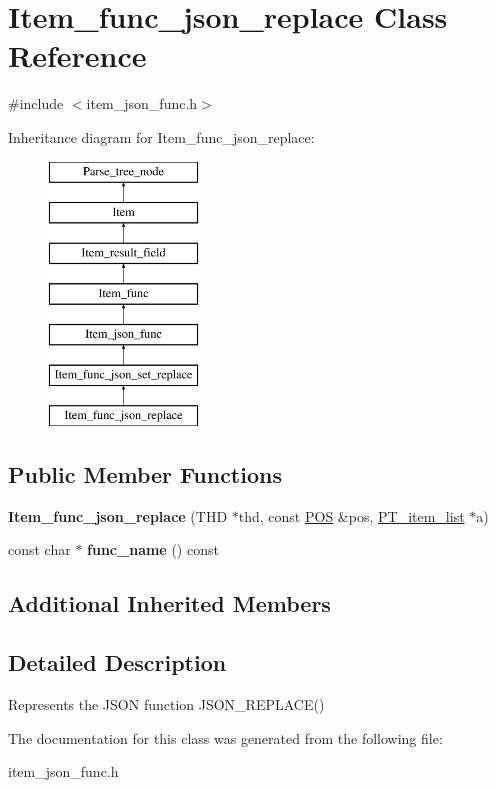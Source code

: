 \hypertarget{classItem__func__json__replace}{}\section{Item\+\_\+func\+\_\+json\+\_\+replace Class Reference}
\label{classItem__func__json__replace}


{\ttfamily \#include $<$item\+\_\+json\+\_\+func.\+h$>$}

Inheritance diagram for Item\+\_\+func\+\_\+json\+\_\+replace\+:\begin{figure}[H]
\begin{center}
\leavevmode
\includegraphics[height=7.000000cm]{classItem__func__json__replace}
\end{center}
\end{figure}
\subsection*{Public Member Functions}
\begin{DoxyCompactItemize}
\item 
\mbox{\label{classItem__func__json__replace_aefa45a7d1f9f81eb91559ad928bdf056}} 
{\bfseries Item\+\_\+func\+\_\+json\+\_\+replace} (T\+HD $\ast$thd, const \mbox{\hyperlink{structYYLTYPE}{P\+OS}} \&pos, \mbox{\hyperlink{classPT__item__list}{P\+T\+\_\+item\+\_\+list}} $\ast$a)
\item 
\mbox{\label{classItem__func__json__replace_a7037b1bda83d01fafb8e4f0d8b3b3f45}} 
const char $\ast$ {\bfseries func\+\_\+name} () const
\end{DoxyCompactItemize}
\subsection*{Additional Inherited Members}


\subsection{Detailed Description}
Represents the J\+S\+ON function J\+S\+O\+N\+\_\+\+R\+E\+P\+L\+A\+C\+E() 

The documentation for this class was generated from the following file\+:\begin{DoxyCompactItemize}
\item 
item\+\_\+json\+\_\+func.\+h\end{DoxyCompactItemize}
